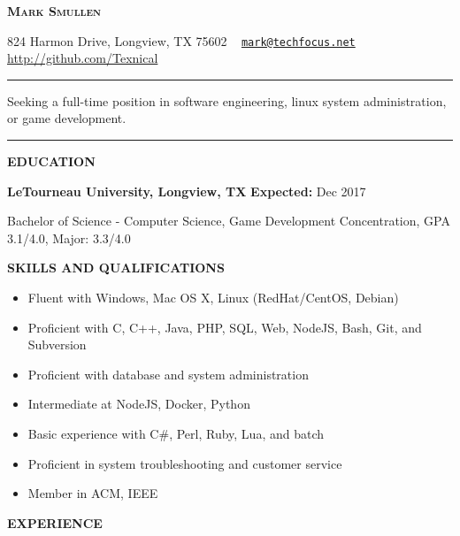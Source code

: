 \documentclass[letterpaper]{article}
\newcommand{\titlename}[1]{\centerline{\huge \bfseries{\scshape{#1}}}}
\newcommand{\contactinfo}[1]{\centerline{\small #1}}
\renewcommand{\section}[1]{\bigskip\noindent\textbf{#1}\smallskip}
\begin{document}
\titlename{Mark Smullen}
\contactinfo{%
    824 Harmon Drive, Longview, TX 75602 \textperiodcentered \ %
    \href{mailto:mark@techfocus.net}{\nolinkurl{mark@techfocus.net}} \textperiodcentered \ %
    \url{http://github.com/Texnical} \textperiodcentered \ %
    \phonenumber[country=US]{2707911770}%
}
\vspace{2mm}
\hrule
\vspace{2mm}
\centerline{Seeking a full-time position in software engineering, linux system administration, or game development.}
\vspace{2mm}
\hrule

\section{EDUCATION}

\textbf{LeTourneau University, Longview, TX}                            \hfill          \textbf{Expected:} Dec 2017

Bachelor of Science - Computer Science, Game Development Concentration, GPA 3.1/4.0, Major: 3.3/4.0


\section{SKILLS AND QUALIFICATIONS}

\begin{multicols}{2}
\begin{itemize}[leftmargin=3.5em]
    \item Fluent with Windows, Mac OS X, Linux (RedHat/CentOS, Debian)
    \item Proficient with C, C++, Java, PHP, SQL, Web, NodeJS, Bash, Git, and Subversion
    \item Proficient with database and system administration
    \item Intermediate at NodeJS, Docker, Python
    \item Basic experience with C\#, Perl, Ruby, Lua, and batch
    \item Proficient in system troubleshooting and customer service
    \item Member in ACM, IEEE
\end{itemize}
\end{multicols}

\section{EXPERIENCE}
\end{document}
